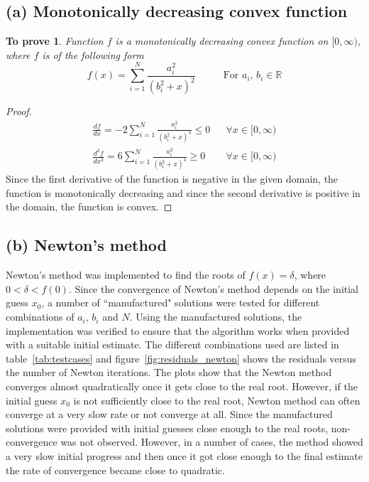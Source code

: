 \documentclass[11pt, oneside]{article}
\newtheorem*{remark}{To prove}
\begin{document}
\subsection*{(a) Monotonically decreasing convex function}
  	\begin{remark}
    		Function $f$ is a monotonically decreasing convex function on $[0,\infty)$, where $f$ is of the following form
    		\begin{equation}
    			f(x) = \sum_{i=1}^{N} \frac{a_i^2}{(b_i^2 + x)^2} \mspace{50mu} \text{For } a_i,\,b_i \in \mathbb{R}  
    		\end{equation} 
 	\end{remark}

  	\begin{proof}
		\begin{align}
			\frac{df}{dx} = -2 \sum_{i=1}^{N} \frac{a_i^2}{(b_i^2 + x)^3}  \leq 0 && \forall x \in [0,\infty) \\
			\frac{d^2f}{dx^2} = 6 \sum_{i=1}^{N} \frac{a_i^2}{(b_i^2 + x)^4}  \geq 0 && \forall x \in [0,\infty)
		\end{align}
		Since the first derivative of the function is negative in the given domain, the function is monotonically decreasing and since the second derivative is positive in the domain, the function is convex.
  	\end{proof}
  
\subsection*{(b) Newton's method}
Newton's method was implemented to find the roots of $f(x) = \delta$, where $0 < \delta < f(0)$. Since the convergence of Newton's method depends on the initial guess $x_0$, a number of ``manufactured" solutions were tested for different combinations of $a_i$, $b_i$ and $N$. Using the manufactured solutions, the implementation was verified to ensure that the algorithm works when provided with a suitable initial estimate. The different combinations used are listed in table~\ref{tab:testcases} and figure~\ref{fig:residuals_newton} shows the residuals versus the number of Newton iterations. The plots show that the Newton method converges almost quadratically once it gets close to the real root. However, if the initial guess $x_0$ is not sufficiently close to the real root, Newton method can often converge at a very slow rate or not converge at all. Since the manufactured solutions were provided with initial guesses close enough to the real roots, non-convergence was not observed. However, in a number of cases, the method showed a very slow initial progress and then once it got close enough to the final estimate the rate of convergence became close to quadratic.
\end{document}
